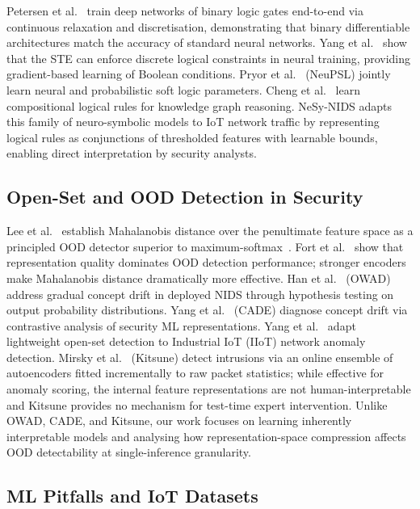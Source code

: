 \documentclass[conference]{IEEEtran}
\begin{document}
Petersen et al.~\cite{petersen2022logic} train deep networks of binary
logic gates end-to-end via continuous relaxation and discretisation,
demonstrating that binary differentiable architectures match the
accuracy of standard neural networks.
Yang et al.~\cite{yang2022ste} show that the STE can enforce discrete
logical constraints in neural training, providing gradient-based
learning of Boolean conditions.
Pryor et al.~\cite{pryor2023neupsl} (NeuPSL) jointly learn neural and
probabilistic soft logic parameters.
Cheng et al.~\cite{cheng2023ncrl} learn compositional logical rules for
knowledge graph reasoning.
NeSy-NIDS adapts this family of neuro-symbolic models to IoT network
traffic by representing logical rules as conjunctions of thresholded
features with learnable bounds, enabling direct interpretation by
security analysts.

\subsection{Open-Set and OOD Detection in Security}

Lee et al.~\cite{lee2018simple} establish Mahalanobis distance over the
penultimate feature space as a principled OOD detector superior to
maximum-softmax~\cite{hendrycks2017baseline}.
Fort et al.~\cite{fort2021exploring} show that representation quality
dominates OOD detection performance; stronger encoders make Mahalanobis
distance dramatically more effective.
Han et al.~\cite{han2023owad} (OWAD) address gradual concept drift in
deployed NIDS through hypothesis testing on output probability
distributions.
Yang et al.~\cite{yang2021cade} (CADE) diagnose concept drift via
contrastive analysis of security ML representations.
Yang et al.~\cite{yang2025openset} adapt lightweight open-set detection
to Industrial IoT (IIoT) network anomaly detection.
Mirsky et al.~\cite{mirsky2018kitsune} (Kitsune) detect intrusions via
an online ensemble of autoencoders fitted incrementally to raw packet
statistics; while effective for anomaly scoring, the internal feature
representations are not human-interpretable and Kitsune provides no
mechanism for test-time expert intervention.
Unlike OWAD, CADE, and Kitsune, our work focuses on learning inherently
interpretable models and analysing how representation-space compression
affects OOD detectability at single-inference granularity.

\subsection{ML Pitfalls and IoT Datasets}
\end{document}

